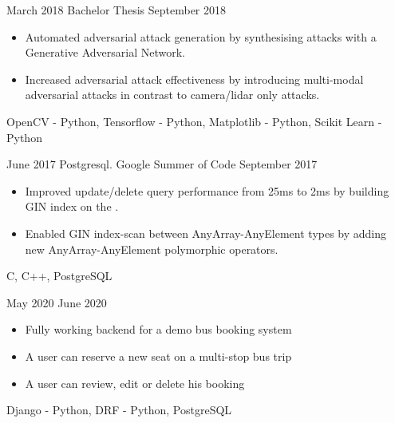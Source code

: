 %
%
%


\begin{projects}
    \project
        {March 2018}
        {}
        {Bachelor Thesis}
        {September 2018}
        {
            \begin{itemize}
                \item Automated adversarial attack generation by synthesising attacks with a Generative Adversarial Network.
                \item Increased adversarial attack effectiveness by introducing multi-modal adversarial attacks in contrast to camera/lidar only attacks.
            \end{itemize}
        }
        {
            OpenCV - Python,
            Tensorflow - Python,
            Matplotlib - Python,
            Scikit Learn - Python
        }
    \emptySeparator

    \project
    {June 2017}
    {}
    {Postgresql. Google Summer of Code}
    {September 2017}
    {
        \begin{itemize}
            \item Improved update/delete query performance from 25ms to 2ms by building GIN index on the  .
            \item Enabled GIN index-scan between AnyArray-AnyElement types by adding new AnyArray-AnyElement polymorphic operators.
        \end{itemize}
    }
    {
        C,
        C++,
        PostgreSQL
    }
    \emptySeparator

    \project
    {May 2020}
    {}
    {}
    {June 2020}
    {
        \begin{itemize}
            \item Fully working backend for a demo bus booking system 
            \item A user can reserve a new seat on a multi-stop bus trip
            \item A user can review, edit or delete his booking
        \end{itemize}
    }
    {
        Django - Python,
        DRF - Python,
        PostgreSQL
    }

\end{projects}
